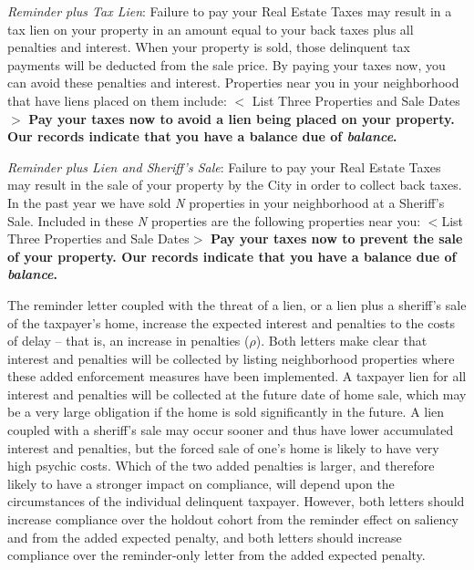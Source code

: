 \documentclass[12pt]{article}
\begin{document}
\bigskip

\noindent \textit{Reminder plus Tax Lien}: Failure to pay your Real
Estate Taxes may result in a tax lien on your property in an amount
equal to your back taxes plus all penalties and interest.  When your
property is sold, those delinquent tax payments will be deducted from
the sale price.  By paying your taxes now, you can avoid these
penalties and interest.  Properties near you in your neighborhood that
have liens placed on them include: $<$ List Three Properties and Sale
Dates $>$ \textbf{Pay your taxes now to avoid a lien being placed on
  your property.  Our records indicate that you have a balance due of
  \textit{balance}.  }

\bigskip

\noindent \textit{Reminder plus Lien and Sheriff's Sale}: Failure to
pay your Real Estate Taxes may result in the sale of your property by
the City in order to collect back taxes.  In the past year we have
sold \textit{N} properties in your neighborhood at a Sheriff's Sale.
Included in these \textit{N} properties are the following properties
near you: $<$List Three Properties and Sale Dates$>$ \textbf{Pay your
  taxes now to prevent the sale of your property.  Our records
  indicate that you have a balance due of \textit{balance}.}

\bigskip

The reminder letter coupled with the threat of a lien, or a lien plus
a sheriff's sale of the taxpayer's home, increase the expected
interest and penalties to the costs of delay -- that is, an increase
in penalties ($\rho$).  Both letters make clear that interest and
penalties will be collected by listing neighborhood properties where
these added enforcement measures have been implemented.  A taxpayer
lien for all interest and penalties will be collected at the future
date of home sale, which may be a very large obligation if the home is
sold significantly in the future.  A lien coupled with a sheriff's
sale may occur sooner and thus have lower accumulated interest and
penalties, but the forced sale of one's home is likely to have very
high psychic costs.  Which of the two added penalties is larger, and
therefore likely to have a stronger impact on compliance, will depend
upon the circumstances of the individual delinquent taxpayer.
However, both letters should increase compliance over the holdout
cohort from the reminder effect on saliency and from the added
expected penalty, and both letters should increase compliance over the
reminder-only letter from the added expected penalty.
\end{document}
